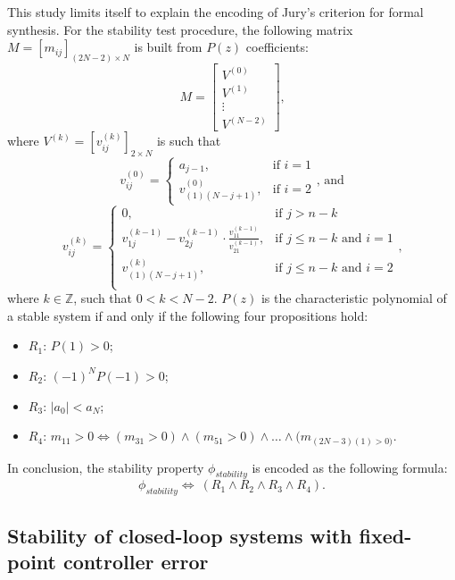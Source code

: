 \documentclass[runningheads,a4paper]{llncs}
\begin{document}
This study limits itself to explain the encoding of Jury's criterion for formal synthesis.  
For the stability  test procedure, the following matrix 
$M=[m_{ij}]_{(2N-2)\times N}$ is built  from $P(z)$ coefficients:
$$
M=\left[
\begin{matrix}
  V^{(0)} \\
  V^{(1)} \\
  \vdots \\
  V^{(N-2)}
 \end{matrix}
\right]\mbox{,}
$$
\noindent where $V^{(k)}=[v^{(k)}_{ij}]_{2\times N}$ is such that
$$
v^{(0)}_{ij}=\begin{cases} 
a_{j-1}, & \mbox{if } i=1 \\   v^{(0)}_{(1)(N-j+1)}, & \mbox{if } i=2 
\end{cases}\mbox{, and} 
$$
$$
v^{(k)}_{ij}=\begin{cases} 
0, & \mbox{if } j>n-k\\
v^{(k-1)}_{1j}-v^{(k-1)}_{2j}\cdot\frac{v^{(k-1)}_{11}}{v^{(k-1)}_{21}}, & \mbox{if } j\leq n-k  \mbox{ and } i=1 \\
v^{(k)}_{(1)(N-j+1)}, & \mbox{if } j\leq n-k \mbox{ and } i=2 \\
\end{cases} \mbox{,}
$$
\noindent where $k\in\mathbb{Z}$, such that $0<k<N-2$. $P(z)$ is the 
characteristic polynomial of a stable system if and only if the following 
four propositions hold:
\begin{itemize}
\item $R_{1}$: $P(1)>0$;
\item $R_{2}$: $(-1)^{N}P(-1)>0$;
\item $R_{3}$: $\vert{a_{0}}\vert <a_{N}$;
\item $R_{4}$: $m_{11}>0\iff (m_{31}>0)\wedge (m_{51}>0)\wedge \dots \wedge (m_{(2N-3)(1)>0)}$.
\end{itemize}
In conclusion, the stability property $\phi_{stability}$ is encoded as the following formula:
$$
\phi_{stability}\iff \ (R_{1} \wedge R_{2} \wedge R_{3} \wedge R_{4}).
$$

\subsection{Stability of closed-loop systems with fixed-point controller error}
\end{document}
